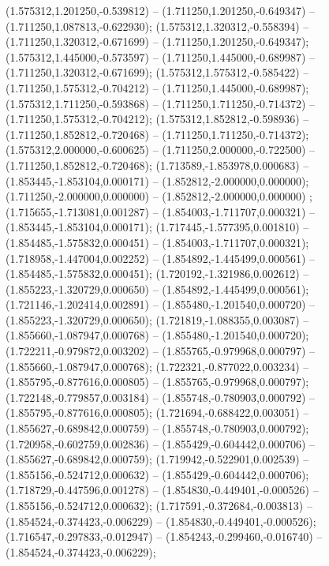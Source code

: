  (1.575312,1.201250,-0.539812) -- (1.711250,1.201250,-0.649347) -- (1.711250,1.087813,-0.622930);
 (1.575312,1.320312,-0.558394) -- (1.711250,1.320312,-0.671699) -- (1.711250,1.201250,-0.649347);
 (1.575312,1.445000,-0.573597) -- (1.711250,1.445000,-0.689987) -- (1.711250,1.320312,-0.671699);
 (1.575312,1.575312,-0.585422) -- (1.711250,1.575312,-0.704212) -- (1.711250,1.445000,-0.689987);
 (1.575312,1.711250,-0.593868) -- (1.711250,1.711250,-0.714372) -- (1.711250,1.575312,-0.704212);
 (1.575312,1.852812,-0.598936) -- (1.711250,1.852812,-0.720468) -- (1.711250,1.711250,-0.714372);
 (1.575312,2.000000,-0.600625) -- (1.711250,2.000000,-0.722500) -- (1.711250,1.852812,-0.720468);
 (1.713589,-1.853978,0.000683) -- (1.853445,-1.853104,0.000171) -- (1.852812,-2.000000,0.000000);
 (1.711250,-2.000000,0.000000) -- (1.852812,-2.000000,0.000000) ;
 (1.715655,-1.713081,0.001287) -- (1.854003,-1.711707,0.000321) -- (1.853445,-1.853104,0.000171);
 (1.717445,-1.577395,0.001810) -- (1.854485,-1.575832,0.000451) -- (1.854003,-1.711707,0.000321);
 (1.718958,-1.447004,0.002252) -- (1.854892,-1.445499,0.000561) -- (1.854485,-1.575832,0.000451);
 (1.720192,-1.321986,0.002612) -- (1.855223,-1.320729,0.000650) -- (1.854892,-1.445499,0.000561);
 (1.721146,-1.202414,0.002891) -- (1.855480,-1.201540,0.000720) -- (1.855223,-1.320729,0.000650);
 (1.721819,-1.088355,0.003087) -- (1.855660,-1.087947,0.000768) -- (1.855480,-1.201540,0.000720);
 (1.722211,-0.979872,0.003202) -- (1.855765,-0.979968,0.000797) -- (1.855660,-1.087947,0.000768);
 (1.722321,-0.877022,0.003234) -- (1.855795,-0.877616,0.000805) -- (1.855765,-0.979968,0.000797);
 (1.722148,-0.779857,0.003184) -- (1.855748,-0.780903,0.000792) -- (1.855795,-0.877616,0.000805);
 (1.721694,-0.688422,0.003051) -- (1.855627,-0.689842,0.000759) -- (1.855748,-0.780903,0.000792);
 (1.720958,-0.602759,0.002836) -- (1.855429,-0.604442,0.000706) -- (1.855627,-0.689842,0.000759);
 (1.719942,-0.522901,0.002539) -- (1.855156,-0.524712,0.000632) -- (1.855429,-0.604442,0.000706);
 (1.718729,-0.447596,0.001278) -- (1.854830,-0.449401,-0.000526) -- (1.855156,-0.524712,0.000632);
 (1.717591,-0.372684,-0.003813) -- (1.854524,-0.374423,-0.006229) -- (1.854830,-0.449401,-0.000526);
 (1.716547,-0.297833,-0.012947) -- (1.854243,-0.299460,-0.016740) -- (1.854524,-0.374423,-0.006229);
